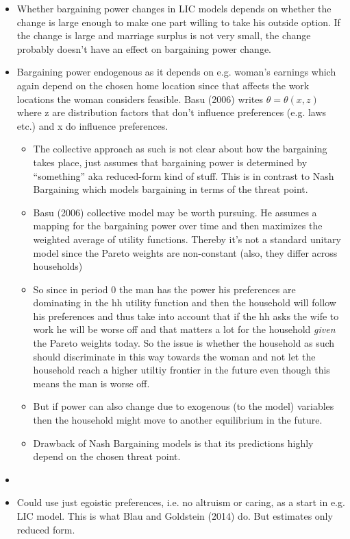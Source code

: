 \begin{itemize}
\item Whether bargaining power changes in LIC models depends on whether the change is large enough to make one part willing to take his outside option. If the change is large and marriage surplus is not very small, the change probably doesn't have an effect on bargaining power change.
\item Bargaining power endogenous as it depends on e.g. woman's earnings which again depend on the chosen home location since that affects the work locations the woman considers feasible. Basu (2006) writes $\theta=\theta(x,z)$ where z are distribution factors that don't influence preferences (e.g. laws etc.) and x do influence preferences.
\begin{itemize}
\item The collective approach as such is not clear about how the bargaining takes place, just assumes that bargaining power is determined by ``something'' aka reduced-form kind of stuff. This is in contrast to Nash Bargaining which models bargaining in terms of the threat point. 
\item Basu (2006) collective model may be worth pursuing. He assumes a mapping for the bargaining power over time and then maximizes the weighted average of utility functions. Thereby it's not a standard unitary model since the Pareto weights are non-constant (also, they differ across households)
\item So since in period 0 the man has the power his preferences are dominating in the hh utility function and then the household will follow his preferences and thus take into account that if the hh asks the wife to work he will be worse off and that matters a lot for the household \textit{given} the Pareto weights today. So the issue is whether the household as such should discriminate in this way towards the woman and not let the household reach a higher utiltiy frontier in the future even though this means the man is worse off.
\item But if power can also change due to exogenous (to the model) variables then the household might move to another equilibrium in the future. 
\item Drawback of Nash Bargaining models is that its predictions highly depend on the chosen threat point.
\end{itemize}
\item \item Could use just egoistic preferences, i.e. no altruism or caring, as a start in e.g. LIC model. This is what Blau and Goldstein (2014) do. But estimates only reduced form.

\end{itemize}
